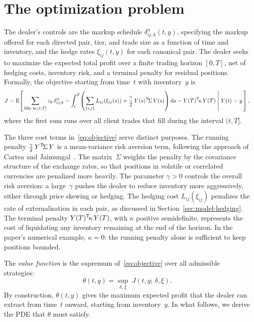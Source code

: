 \section{The optimization problem}
\label{sec:model-objective}

The dealer's controls are the markup schedule $\delta^n_{ij,k}(t, y)$, specifying the markup offered for each directed pair, tier, and trade size as a function of time and inventory, and the hedge rates $\xi_{ij}(t, y)$ for each canonical pair. The dealer seeks to maximize the expected total profit over a finite trading horizon $[0, T]$, net of hedging costs, inventory risk, and a terminal penalty for residual positions. Formally, the objective starting from time~$t$ with inventory~$y$ is
\begin{equation}
  \label{eq:objective}
  J = \mathbb{E}\!\left[\,\sum_{\text{fills in}\,(t,T]} z_k\,\delta^n_{ij,k} - \int_t^T\!\left(\sum_{\{i,j\}} L_{ij}\!\left(\xi_{ij}(s)\right) + \frac{\gamma}{2}\,Y(s)^{\mathsf{T}}\!\Sigma\,Y(s)\right) \mathrm{d} s - Y(T)^{\mathsf{T}}\!\kappa\,Y(T) \;\middle|\; Y(t) = y\,\right],
\end{equation}
where the first sum runs over all client trades that fill during the interval $(t, T]$.

The three cost terms in~\eqref{eq:objective} serve distinct purposes. The running penalty $\frac{\gamma}{2}\,Y^{\mathsf{T}}\!\Sigma\,Y$ is a mean-variance risk aversion term, following the approach of Cartea and Jaimungal~\cite{cartea2014}. The matrix~$\Sigma$ weights the penalty by the covariance structure of the exchange rates, so that positions in volatile or correlated currencies are penalized more heavily. The parameter $\gamma > 0$ controls the overall risk aversion: a large~$\gamma$ pushes the dealer to reduce inventory more aggressively, either through price skewing or hedging. The hedging cost $L_{ij}(\xi_{ij})$ penalizes the rate of externalisation in each pair, as discussed in Section~\ref{sec:model-hedging}. The terminal penalty $Y(T)^{\mathsf{T}}\!\kappa\,Y(T)$, with $\kappa$ positive semidefinite, represents the cost of liquidating any inventory remaining at the end of the horizon. In the paper's numerical example, $\kappa = 0$: the running penalty alone is sufficient to keep positions bounded.

The \emph{value function} is the supremum of~\eqref{eq:objective} over all admissible strategies:
\begin{equation}
  \label{eq:value-function}
  \theta(t, y) = \sup_{\delta,\,\xi}\; J(t, y;\, \delta, \xi).
\end{equation}
By construction, $\theta(t,y)$ gives the maximum expected profit that the dealer can extract from time~$t$ onward, starting from inventory~$y$. In what follows, we derive the PDE that $\theta$ must satisfy.


